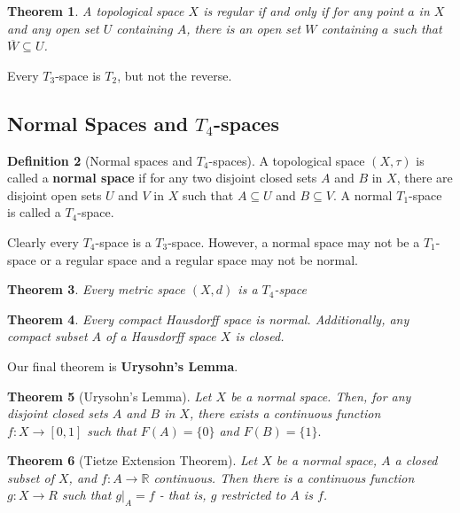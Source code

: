 \documentclass[10pt, oneside, reqno]{amsart}
\theoremstyle{plain}%
\newtheorem{thm}{Theorem}[section]
\theoremstyle{definition}
\newtheorem{defn}[thm]{Definition}
\theoremstyle{remark}
\newcommand{\R}{\mathbb{R}}
\newcommand{\met}{(X,d)}
\newcommand{\topo}{(X,\tau)}
\newcommand{\ol}[1]{\overline{#1}}
\begin{document}
\begin{thm}
    A topological space $X$ is regular if and only if for any point $a$ in $X$ and any open set $U$ containing $A$, there is an open set $W$ containing $a$ such that $\ol W \subseteq U$.

\end{thm}

Every $T_3$-space is $T_2$, but not the reverse.


\subsection{Normal Spaces and $T_4$-spaces} %
\label{sub:normal_spaces_and_t_4_spaces}

\begin{defn}[Normal spaces and $T_4$-spaces]
    A topological space $\topo$ is called a \textbf{normal space} if for any two disjoint closed sets $A$ and $B$ in $X$, there are disjoint open sets $U$ and $V$ in $X$ such that $A \subseteq U$ and $B \subseteq V$.  A normal $T_1$-space is called a $T_4$-space.
\end{defn}

Clearly every $T_4$-space is a $T_3$-space.  However, a normal space may not be a $T_1$-space or a regular space and a regular space may not be normal.

\begin{thm}
    Every metric space $\met$ is a $T_4$-space
\end{thm}

\begin{thm}
    Every compact Hausdorff space is normal.  Additionally, any compact subset $A$ of a Hausdorff space $X$ is closed.
\end{thm}

Our final theorem is \textbf{Urysohn's Lemma}.
\begin{thm}[Urysohn's Lemma]
    Let $X$ be a normal space.  Then, for any disjoint closed sets $A$ and $B$ in $X$, there exists a continuous function $f: X \rightarrow [0,1]$ such that $F(A) = \{0 \}$ and $F(B) = \{1 \}.$
\end{thm}

\begin{thm}[Tietze Extension Theorem]
    Let $X$ be a normal space, $A$ a closed subset of $X$, and $f : A \rightarrow \R$ continuous.  Then there is a continuous function $g: X \rightarrow R$ such that $g |_A = f$ - that is, $g$ restricted to $A$ is $f$. 
\end{thm}
\end{document}
